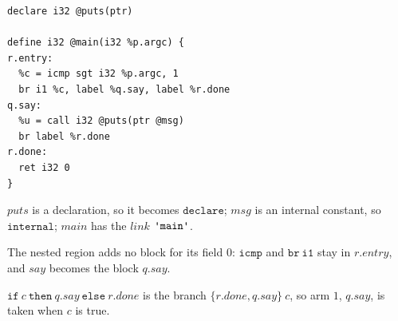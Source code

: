 \documentclass[11pt,letterpaper]{article}
\newcommand{\kw}[1]{\mathtt{#1}}
\newcommand{\str}[1]{\text{\ttfamily\textquotesingle #1\textquotesingle}}  %
\newcounter{pt}
\begin{document}
\begin{points}
\begin{Verbatim}[xleftmargin=2em]
declare i32 @puts(ptr)

define i32 @main(i32 %p.argc) {
r.entry:
  %c = icmp sgt i32 %p.argc, 1
  br i1 %c, label %q.say, label %r.done
q.say:
  %u = call i32 @puts(ptr @msg)
  br label %r.done
r.done:
  ret i32 0
}
\end{Verbatim}
  \begin{subpoints}
  \item $\mathit{puts}$ is a declaration, so it becomes $\kw{declare}$; $\mathit{msg}$ is an internal constant, so
    $\kw{internal}$; $\mathit{main}$ has the $\mathit{link}$ $\str{main}$.
  \item The nested region adds no block for its field $0$: $\kw{icmp}$ and $\kw{br\ i1}$ stay in $r.\mathit{entry}$, and $\mathit{say}$
    becomes the block $q.\mathit{say}$.
  \item $\kw{if}\ c\ \kw{then}\ q.\mathit{say}\ \kw{else}\ r.\mathit{done}$ is the branch $\{r.\mathit{done}, q.\mathit{say}\}\ c$, so arm $1$, $q.\mathit{say}$, is
    taken when $c$ is true.
  \end{subpoints}
\end{points}
\end{document}
